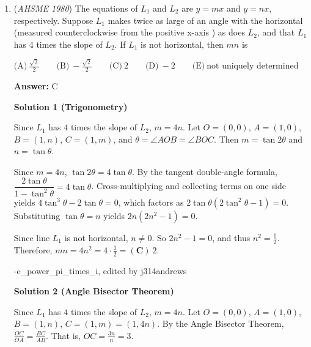 \begin{enumerate}
 Then $\frac{1}{10} = \frac{a_{50}+a_{51}}{2} = \frac{a_5 + 45d + a_6 + 45d}{2} = \frac{a_5+a_6}{2} + 45d = 10 + 45d$, so $d = -\frac{11}{50}$.  So the mean of the first $110$ terms is $\frac{a_{55}+a_{56}}{2} = \frac{a_{50}+5d+a_{51}+5d}{2} = \frac{a_{50}+a_{51}}{2}+5d=\frac{1}{10}+5\cdot-\frac{11}{50}=-1$.  Therefore, the sum of the first $110$ terms is $110 \cdot -1 =  \boxed{(\textbf{D}) -110}$.

 -j314andrews

 


	\item (\textit{AHSME 1980}) The equations of $L_1$ and $L_2$ are $y=mx$ and $y=nx$, respectively. Suppose $L_1$ makes twice as large of an angle with the horizontal (measured counterclockwise from the positive x-axis ) as does $L_2$, and that $L_1$ has 4 times the slope of $L_2$. If $L_1$ is not horizontal, then $mn$ is


 $\text{(A)} \ \frac{\sqrt{2}}{2} \qquad \text{(B)} \ -\frac{\sqrt{2}}{2} \qquad \text{(C)} \ 2 \qquad \text{(D)} \ -2 \qquad \text{(E)} \ \text{not uniquely determined}$

 \textbf{Answer: }C



\textbf{Solution 1 (Trigonometry)}

Since $L_1$ has $4$ times the slope of $L_2$, $m = 4n$.  Let $O = (0,0)$, $A = (1,0)$, $B = (1,n)$, $C = (1,m)$, and $\theta = \angle AOB = \angle BOC$.  Then $m = \tan 2\theta$ and $n = \tan \theta$.  

 Since $m = 4n$, $\tan 2\theta = 4\tan \theta$. By the tangent double-angle formula, $\dfrac{2\tan \theta}{1-\tan^2 \theta} = 4\tan \theta$. Cross-multiplying and collecting terms on one side yields $4\tan^3 \theta - 2\tan\theta = 0$, which factors as $2\tan \theta(2\tan^2\theta - 1) = 0$. Substituting $\tan\theta = n$ yields $2n(2n^2-1)=0$.

 Since line $L_1$ is not horizontal, $n \neq 0$.  So $2n^2 - 1 = 0$, and thus $n^2 = \frac{1}{2}$.  Therefore, $mn = 4n^2 = 4 \cdot \frac{1}{2} = \boxed{(\textbf{C}) \ 2}$.

 -e\_power\_pi\_times\_i, edited by j314andrews

 



\textbf{Solution 2 (Angle Bisector Theorem)}

Since $L_1$ has $4$ times the slope of $L_2$, $m = 4n$.  Let $O = (0,0)$, $A = (1,0)$, $B = (1,n)$, $C = (1,m) = (1, 4n)$.  By the Angle Bisector Theorem, $\frac{OC}{OA} = \frac{BC}{AB}$.  That is, $OC = \frac{3n}{n} = 3$.


\end{enumerate}
